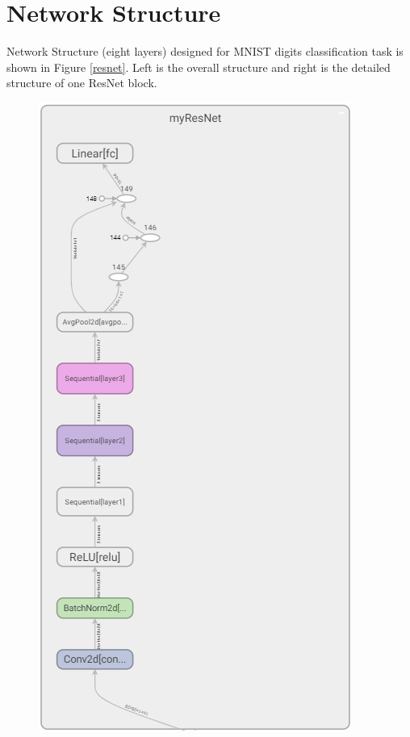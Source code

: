 \documentclass{elegantbook}
\begin{document}
\section{Network Structure}
Network Structure (eight layers) designed for MNIST digits classification task is shown in Figure \ref{resnet}. Left is the overall structure and right is the detailed structure of one ResNet block.
\begin{figure}[!h]
	\centering
	\begin{minipage}[t]{0.335\textwidth}
		\centering
		\includegraphics[width=\textwidth]{../results/myresnet1}

\end{minipage}
\end{figure}
\end{document}

